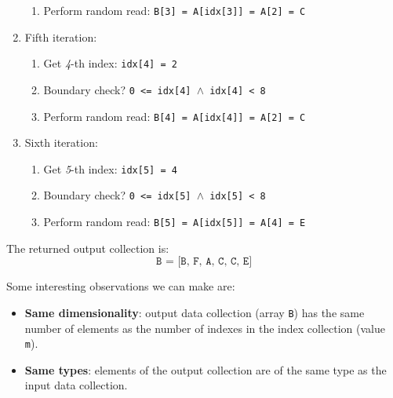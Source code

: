 \begin{examplebox}
\begin{enumerate}
\begin{enumerate}
            \item Perform random read: \texttt{B[3] = A[idx[3]] = A[2] = C}
        \end{enumerate}
        \item Fifth iteration:
        \begin{enumerate}
            \item Get \emph{4}-th index: \texttt{idx[4] = 2}
            \item Boundary check? \texttt{0 <= idx[4] $\land$ idx[4] < 8} \textcolor{Green3}{}
            \item Perform random read: \texttt{B[4] = A[idx[4]] = A[2] = C}
        \end{enumerate}
        \item Sixth iteration:
        \begin{enumerate}
            \item Get \emph{5}-th index: \texttt{idx[5] = 4}
            \item Boundary check? \texttt{0 <= idx[5] $\land$ idx[5] < 8} \textcolor{Green3}{}
            \item Perform random read: \texttt{B[5] = A[idx[5]] = A[4] = E}
        \end{enumerate}
    \end{enumerate}
    The returned output collection is:
    \begin{equation*}
        \texttt{B = [B, F, A, C, C, E]}
    \end{equation*}
\end{examplebox}

\noindent
Some interesting observations we can make are:
\begin{itemize}
    \item \textbf{Same dimensionality}: output data collection (array \texttt{B}) has the same number of elements as the number of indexes in the index collection (value \texttt{m}).
    \item \textbf{Same types}: elements of the output collection are of the same type as the input data collection.
\end{itemize}